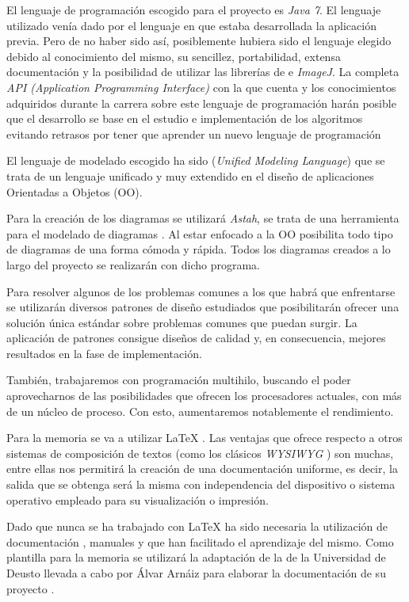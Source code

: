 El lenguaje de programación escogido para el proyecto es \textit{Java 7}. El lenguaje utilizado venía dado por el lenguaje en que estaba desarrollada la aplicación previa. Pero de no haber sido así, posiblemente hubiera sido el lenguaje elegido debido al conocimiento del mismo, su sencillez, portabilidad, extensa documentación y la posibilidad de utilizar las librerías de \weka{} e \textit{ImageJ}. La completa \textit{API (Application Programming Interface)} con la que cuenta y los conocimientos adquiridos durante la carrera sobre este lenguaje de programación harán posible que el desarrollo se base en el estudio e implementación de los algoritmos evitando retrasos por tener que aprender un nuevo lenguaje de programación

El lenguaje de modelado escogido ha sido \uml{} (\textit{Unified Modeling Language}) que se trata de un lenguaje unificado y muy extendido en el diseño de aplicaciones Orientadas a Objetos (OO).

Para la creación de los diagramas se utilizará \textit{Astah}, se trata de una herramienta para el modelado de diagramas \uml{}. Al estar enfocado a la OO posibilita todo tipo de diagramas de una forma cómoda y rápida. Todos los diagramas creados a lo largo del proyecto se realizarán con dicho programa.

Para resolver algunos de los problemas comunes a los que habrá que enfrentarse se utilizarán diversos patrones de diseño \cite{patrones} estudiados que posibilitarán ofrecer una solución única estándar sobre problemas comunes que puedan surgir. La aplicación de patrones consigue diseños de calidad y, en consecuencia, mejores resultados en la fase de implementación.

También, trabajaremos con programación multihilo, buscando el poder aprovecharnos de las posibilidades que ofrecen los procesadores actuales, con más de un núcleo de proceso. Con esto, aumentaremos notablemente el rendimiento.

Para la memoria se va a utilizar \LaTeX{} \cite{definicion_latex}. Las ventajas que ofrece respecto a otros sistemas de composición de textos (como los clásicos \textit{WYSIWYG} \cite{wysiwyg}) son muchas, entre ellas nos permitirá la creación de una documentación uniforme, es decir, la salida que se obtenga será la misma con independencia del dispositivo o sistema operativo empleado para su visualización o impresión.

Dado que nunca se ha trabajado con \LaTeX{} ha sido necesaria la utilización de documentación \cite{cervantex}, manuales \cite{introduccion_latex} y \cite{latex_wikibook} que han facilitado el aprendizaje del mismo. Como plantilla para la memoria se utilizará la adaptación de la de la Universidad de Deusto llevada a cabo por Álvar Arnáiz para elaborar la documentación de su proyecto \cite{proyectoAlvar}.

